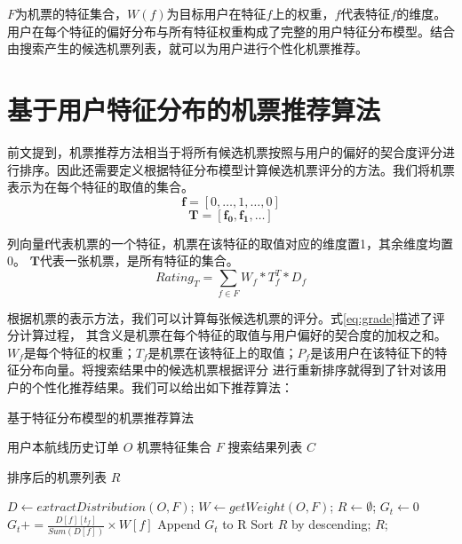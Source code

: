 $F$为机票的特征集合，$W(f)$为目标用户在特征$f$上的权重，$f$代表特征$f$的维度。用户在每个特征的偏好分布与所有特征权重构成了完整的用户特征分布模型。结合由搜索产生的候选机票列表，就可以为用户进行个性化机票推荐。

\section{基于用户特征分布的机票推荐算法}
\label{sec:base_rec}

前文提到，机票推荐方法相当于将所有候选机票按照与用户的偏好的契合度评分进行排序。因此还需要定义根据特征分布模型计算候选机票评分的方法。我们将机票表示为在每个特征的取值的集合。
\begin{equation}
  \mathbf{f} = [0,\dots,1,\dots,0]
\end{equation}
\begin{equation}
  \mathbf{T} = [\mathbf{f_0},\mathbf{f_1},\dots]
\end{equation}\par
列向量$\mathbf{f}$代表机票的一个特征，机票在该特征的取值对应的维度置1，其余维度均置0。 $\mathbf{T}$代表一张机票，是所有特征的集合。
\begin{equation}
	\label{eq:grade}
	Rating_T = \sum_{f \in F}W_f*T_f^T*D_f
\end{equation}

根据机票的表示方法，我们可以计算每张候选机票的评分。式\ref{eq:grade}描述了评分计算过程，
其含义是机票在每个特征的取值与用户偏好的契合度的加权之和。$W_f$是每个特征的权重；$T_f$是机票在该特征上的取值；$P_f$是该用户在该特征下的特征分布向量。将搜索结果中的候选机票根据评分
进行重新排序就得到了针对该用户的个性化推荐结果。我们可以给出如下推荐算法：

\begin{algorithm}
\caption{基于特征分布模型的机票推荐算法}
\label{algo:pref_rec}
\begin{algorithmic}[1]
\Require
\Statex 用户本航线历史订单 $O$
\Statex 机票特征集合 $F$
\Statex 搜索结果列表 $C$

\Ensure 
\Statex 排序后的机票列表 $R$

\State $D \gets extractDistribution(O,F)$;
\State $W \gets getWeight(O,F)$;
\State $R \gets \emptyset$;
\State $G_t \gets 0$
\State $G_t += \frac{D[f][t_f]}{Sum(D[f])} \times W[f] $
\EndFor
\State Append $G_t$ to R
\EndFor 
\State Sort $R$ by descending;
\State \Return $R$;
\end{algorithmic}
\end{algorithm}


